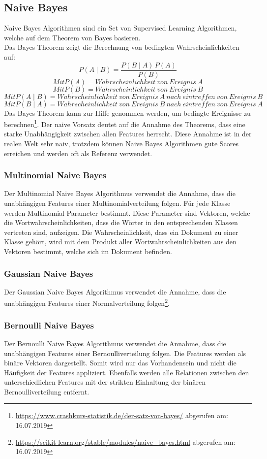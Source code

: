 \subsection{Naive Bayes}
Naive Bayes Algorithmen sind ein Set von Supervised Learning Algorithmen, welche auf dem Theorem von Bayes basieren.\\
Das Bayes Theorem zeigt die Berechnung von bedingten Wahrscheinlichkeiten auf:
$$ P(A \mid B) = \frac{P(B \mid A) \, P(A)}{P(B)} $$
$$ Mit P(A) = Wahrscheinlichkeit\ von\ Ereignis\ A$$
$$ Mit P(B) = Wahrscheinlichkeit\ von\ Ereignis\ B$$
$$ Mit P(A \mid B) = Wahrscheinlichkeit\ von\ Ereignis\ A\ nach\ eintreffen\ von\ Ereignis\ B$$
$$ Mit P(B \mid A) = Wahrscheinlichkeit\ von\ Ereignis\ B\ nach\ eintreffen\ von\ Ereignis\ A$$
Das Bayes Theorem kann zur Hilfe genommen werden, um bedingte Ereignisse zu berechnen\footnote{\url{https://www.crashkurs-statistik.de/der-satz-von-bayes/} abgerufen am: 16.07.2019}.
Der naive Vorsatz deutet auf die Annahme des Theorems, dass eine starke Unabhängigkeit zwischen allen Features herrscht.
Diese Annahme ist in der realen Welt sehr naiv, trotzdem können Naive Bayes Algorithmen gute Scores erreichen und werden oft als Referenz verwendet\cite{rennie2003tackling}. 
\subsubsection{Multinomial Naive Bayes}
Der Multinomial Naive Bayes Algorithmus verwendet die Annahme, dass die unabhängigen Features einer Multinomialverteilung folgen.
Für jede Klasse werden Multinomial-Parameter bestimmt.
Diese Parameter sind Vektoren, welche die Wortwahrscheinlichkeiten, dass die Wörter in den entsprechenden Klassen vertreten sind, aufzeigen.
Die Wahrscheinlichkeit, dass ein Dokument zu einer Klasse gehört, wird mit dem Produkt aller Wortwahrscheinlichkeiten aus den Vektoren bestimmt, welche sich im Dokument befinden\cite{rennie2003tackling}.
\subsubsection{Gaussian Naive Bayes}
Der Gaussian Naive Bayes Algorithmus verwendet die Annahme, dass die unabhängigen Features einer Normalverteilung folgen\footnote{\url{https://scikit-learn.org/stable/modules/naive_bayes.html} abgerufen am: 16.07.2019}\cite{scikit-learn}.
\subsubsection{Bernoulli Naive Bayes}
Der Bernoulli Naive Bayes Algorithmus verwendet die Annahme, dass die unabhängigen Features einer Bernoulliverteilung folgen.
Die Features werden als binäre Vektoren dargestellt.
Somit wird nur das Vorhandensein und nicht die Häufigkeit der Features appliziert.
Ebenfalls werden alle Relationen zwischen den unterschiedlichen Features mit der strikten Einhaltung der binären Bernoulliverteilung entfernt\cite{mccallum1998comparison}.
